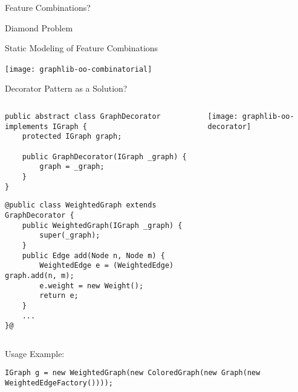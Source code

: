 \begin{frame}{Feature Combinations?}
\end{frame}

\begin{frame}{Diamond Problem}
\end{frame}

\begin{frame}{Static Modeling of Feature Combinations}
	\begin{mycolumns}[columns=2,widths={70,30},animation=none]
		\texttt{[image: graphlib-oo-combinatorial]}
	\mynextcolumn
		~
	\end{mycolumns}
\end{frame}

\begin{frame}[fragile]{Decorator Pattern as a Solution?}
		\begin{columns}
\begin{tiny}
\begin{lstlisting}
public abstract class GraphDecorator implements IGraph {
	protected IGraph graph;
	
	public GraphDecorator(IGraph _graph) { 
		graph = _graph; 
	}
}
\end{lstlisting}
\begin{lstlisting}
@public class WeightedGraph extends GraphDecorator {
	public WeightedGraph(IGraph _graph) {
		super(_graph);
	}
	public Edge add(Node n, Node m) {
		WeightedEdge e = (WeightedEdge) graph.add(n, m);
		e.weight = new Weight();
		return e;
	}
	...
}@
\end{lstlisting}
\end{tiny}	
				\texttt{[image: graphlib-oo-decorator]}	
		\end{columns}
Usage Example: 
\begin{tiny}
\begin{lstlisting}
IGraph g = new WeightedGraph(new ColoredGraph(new Graph(new WeightedEdgeFactory())));
\end{lstlisting}
\end{tiny}	
\end{frame}

